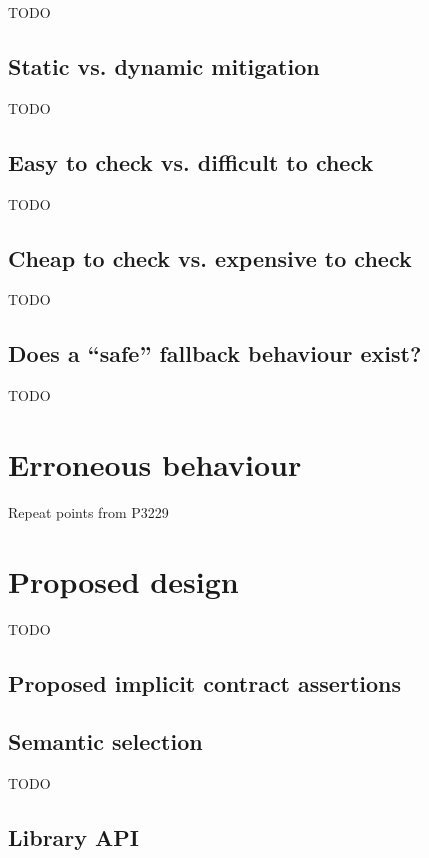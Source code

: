 TODO

\subsection{Static vs. dynamic mitigation}

TODO

\subsection{Easy to check vs. difficult to check}
\label{howeasytocheck}

TODO

\subsection{Cheap to check vs. expensive to check}

TODO

\subsection{Does a ``safe'' fallback behaviour exist?}

TODO

\section{Erroneous behaviour}
\label{eb}

Repeat points from P3229

\section{Proposed design}

TODO

\subsection{Proposed implicit contract assertions}
\label{proposedlist}

\subsection{Semantic selection}
\label{labels}

TODO


\subsection{Library API}
\label{libraryapi}

